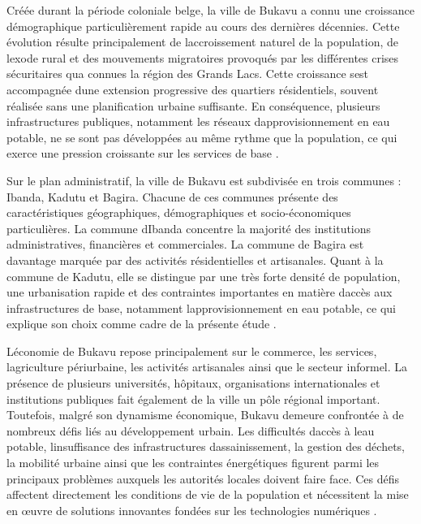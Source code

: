 \documentclass[12pt,a4paper,oneside]{report}
\begin{document}
Créée durant la période coloniale belge, la ville de Bukavu a connu une
croissance démographique particulièrement rapide au cours des dernières
décennies. Cette évolution résulte principalement de
l\textquotesingle accroissement naturel de la population, de
l\textquotesingle exode rural et des mouvements migratoires provoqués
par les différentes crises sécuritaires qu\textquotesingle a connues la
région des Grands Lacs. Cette croissance s\textquotesingle est
accompagnée d\textquotesingle une extension progressive des quartiers
résidentiels, souvent réalisée sans une planification urbaine
suffisante. En conséquence, plusieurs infrastructures publiques,
notamment les réseaux d\textquotesingle approvisionnement en eau
potable, ne se sont pas développées au même rythme que la population, ce
qui exerce une pression croissante sur les services de base \cite{ref82}.

Sur le plan administratif, la ville de Bukavu est subdivisée en trois
communes : Ibanda, Kadutu et Bagira. Chacune de ces communes présente
des caractéristiques géographiques, démographiques et socio-économiques
particulières. La commune d\textquotesingle Ibanda concentre la majorité
des institutions administratives, financières et commerciales. La
commune de Bagira est davantage marquée par des activités résidentielles
et artisanales. Quant à la commune de Kadutu, elle se distingue par une
très forte densité de population, une urbanisation rapide et des
contraintes importantes en matière d\textquotesingle accès aux
infrastructures de base, notamment l\textquotesingle approvisionnement
en eau potable, ce qui explique son choix comme cadre de la présente
étude \cite{ref84}.

L\textquotesingle économie de Bukavu repose principalement sur le
commerce, les services, l\textquotesingle agriculture périurbaine, les
activités artisanales ainsi que le secteur informel. La présence de
plusieurs universités, hôpitaux, organisations internationales et
institutions publiques fait également de la ville un pôle régional
important. Toutefois, malgré son dynamisme économique, Bukavu demeure
confrontée à de nombreux défis liés au développement urbain. Les
difficultés d\textquotesingle accès à l\textquotesingle eau potable,
l\textquotesingle insuffisance des infrastructures
d\textquotesingle assainissement, la gestion des déchets, la mobilité
urbaine ainsi que les contraintes énergétiques figurent parmi les
principaux problèmes auxquels les autorités locales doivent faire face.
Ces défis affectent directement les conditions de vie de la population
et nécessitent la mise en œuvre de solutions innovantes fondées sur les
technologies numériques \cite{ref85}.
\end{document}
